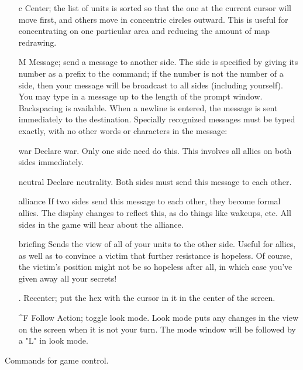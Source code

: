\begin{itemize}
\item[{c}]
Center; the list of units is sorted so that the one at the current cursor
will move first, and others move in concentric circles outward.  This is
useful for concentrating on one particular area and reducing the amount of
map redrawing.
\item[{M}]
Message; send a message to another side.  The side is specified by giving its
number as a prefix to the command; if the number is not the number of a side,
then your message will be broadcast to all sides (including yourself).
You may type in a message up to the
length of the prompt window.  Backspacing is available.
When a newline is entered, the message is sent immediately to
the destination.
Specially recognized messages must be typed exactly, with no other words
or characters in the message:
\item[{war}]
Declare war.  Only one side need do this.  This involves all allies on both
sides immediately.
\item[{neutral}]
Declare neutrality.  Both sides must send this message to each other.
\item[{alliance}]
If two sides send this message to each other, they become formal allies.
The display changes to reflect this, as do things like wakeups, etc.
All sides in the game will hear about the alliance.
\item[{briefing}]
Sends the view of all of your units to the other side.  Useful for allies,
as well as to convince a victim that further resistance is hopeless.
Of course, the victim's position might not be so hopeless after all, in
which case you've given away all your secrets!
\item[{.}]
Recenter; put the hex with the cursor in it in the center of the screen.
\item[{\^{}F}]
Follow Action; toggle look mode.  Look mode puts any changes in the
view on the screen when it is not your turn.  The mode window will be
followed by a "L" in look mode.
\end{itemize}\par\noindent
Commands for game control.
